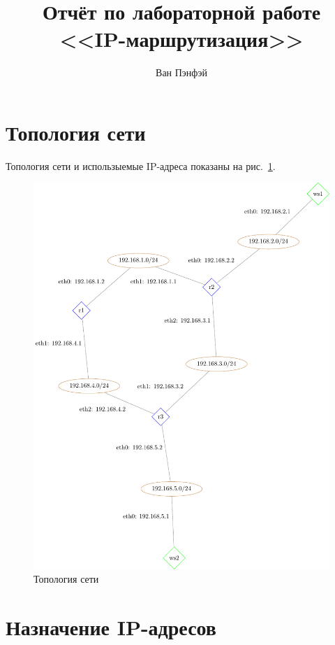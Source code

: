 \documentclass[a4paper,12pt]{article}
\title{Отчёт по лабораторной работе \\ <<IP-маршрутизация>>}
\author{Ван Пэнфэй}
\begin{document}
\maketitle

\tableofcontents


\section{Топология сети}

Топология сети и использыемые IP-адреса показаны на рис.~\ref{fig:network}.

\begin{figure}
\centering
\includegraphics[width=\textwidth]{includes/network_gv.pdf}
\caption{Топология сети}
\label{fig:network}
\end{figure}


\section{Назначение IP-адресов}
\end{document}
